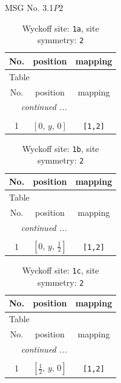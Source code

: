 \documentclass[fleqn,8pt]{jsarticle}
\begin{document}
\setcounter{MaxMatrixCols}{32}

\renewcommand{\tablename}{Table~}
\renewcommand{\figurename}{Figure~}
\begin{center}
\LARGE
MSG No. 3.1\quad$P2$
\end{center}
\renewcommand{\arraystretch}{1.2}
\begin{longtable}{ccc}
\caption{Wyckoff site: {\tt 1a}, site symmetry: {\tt 2}}
 \\
 \hline \hline
No. & position & mapping \\ \hline \endfirsthead

\multicolumn{2}{l}{\tablename\ \thetable{}} \\
 \hline \hline
No. & position & mapping \\ \hline \endhead

 \hline \hline
\multicolumn{2}{r}{\footnotesize\it continued ...} \\ \endfoot

 \hline \hline
\multicolumn{2}{r}{} \\ \endlastfoot

1 & $\left[ 0,\, y,\, 0 \right]$ & {\tt [1,2]} \\
\end{longtable}
\renewcommand{\arraystretch}{1.2}
\begin{longtable}{ccc}
\caption{Wyckoff site: {\tt 1b}, site symmetry: {\tt 2}}
 \\
 \hline \hline
No. & position & mapping \\ \hline \endfirsthead

\multicolumn{2}{l}{\tablename\ \thetable{}} \\
 \hline \hline
No. & position & mapping \\ \hline \endhead

 \hline \hline
\multicolumn{2}{r}{\footnotesize\it continued ...} \\ \endfoot

 \hline \hline
\multicolumn{2}{r}{} \\ \endlastfoot

1 & $\left[ 0,\, y,\, \frac{1}{2} \right]$ & {\tt [1,2]} \\
\end{longtable}
\renewcommand{\arraystretch}{1.2}
\begin{longtable}{ccc}
\caption{Wyckoff site: {\tt 1c}, site symmetry: {\tt 2}}
 \\
 \hline \hline
No. & position & mapping \\ \hline \endfirsthead

\multicolumn{2}{l}{\tablename\ \thetable{}} \\
 \hline \hline
No. & position & mapping \\ \hline \endhead

 \hline \hline
\multicolumn{2}{r}{\footnotesize\it continued ...} \\ \endfoot

 \hline \hline
\multicolumn{2}{r}{} \\ \endlastfoot

1 & $\left[ \frac{1}{2},\, y,\, 0 \right]$ & {\tt [1,2]} \\
\end{longtable}
\end{document}
